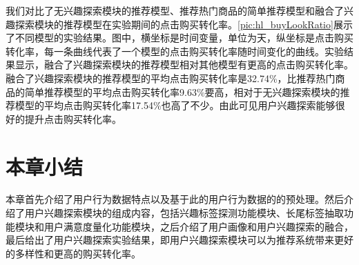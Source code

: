   我们对比了无兴趣探索模块的推荐模型、推荐热门商品的简单推荐模型和融合了兴趣探索模块的推荐模型在实验期间的点击购买转化率。\autoref{pic:hl_buyLookRatio}展示了不同模型的实验结果。图中，横坐标是时间变量，单位为天，纵坐标是点击购买转化率，每一条曲线代表了一个模型的点击购买转化率随时间变化的曲线。实验结果显示，融合了兴趣探索模块的推荐模型相对其他模型有更高的点击购买转化率。融合了兴趣探索模块的推荐模型的平均点击购买转化率是32.74\%，比推荐热门商品的简单推荐模型的平均点击购买转化率9.63\%要高，相对于无兴趣探索模块的推荐模型的平均点击购买转化率17.54\%也高了不少。由此可见用户兴趣探索能够很好的提升点击购买转化率。
  \begin{figure}
  \centering
    \label{pic:hl_buyLookRatio}
  \end{figure}

\section{本章小结}
本章首先介绍了用户行为数据特点以及基于此的用户行为数据的的预处理。然后介绍了用户兴趣探索模块的组成内容，包括兴趣标签探测功能模块、长尾标签抽取功能模块和用户满意度量化功能模块，之后介绍了用户画像和用户兴趣探索的融合，最后给出了用户兴趣探索实验结果，即用户兴趣探索模块可以为推荐系统带来更好的多样性和更高的购买转化率。